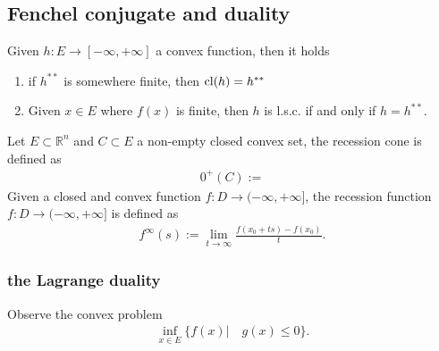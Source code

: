 \subsection{Fenchel conjugate and duality}
\begin{theorem}
	Given $h: E \rightarrow [-\infty, +\infty]$ a convex function, then it holds
	\begin{enumerate}
		\item if $h^{**}$ is somewhere finite, then $\operatorname*{cl}(h) = h^{**}$
		\item Given $x \in E$ where $f(x)$ is finite, then $h$ is l.s.c. if and only if $h = h^{**}$. 
	\end{enumerate}
\end{theorem}

\begin{theorem}
\end{theorem}


\begin{definition}
Let $E \subset \mathbb{R}^n$ and $C \subset E$ a non-empty closed convex set, the recession cone is defined as
	\begin{align*}
		0^+(C):= 
	\end{align*}
	Given a closed and convex function $f: D \rightarrow (-\infty, +\infty]$, the recession function $f: D \rightarrow ( -\infty, +\infty]$ is defined as 
	\begin{align*}
		f^\infty(s):= \lim_{t \rightarrow \infty} \frac{f(x_0 + ts) - f(x_0)}{t}.
	\end{align*}
\end{definition}

\subsubsection{the Lagrange duality}
Observe the convex problem
\begin{align*}
	\inf_{x \in E} \{ f(x) | \quad g(x) \le 0 \}.
\end{align*}


